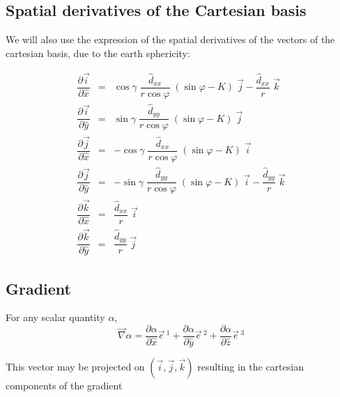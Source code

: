 \subsection{Spatial derivatives of the Cartesian basis}

We will also use the expression of the spatial derivatives of the
vectors of the cartesian basis, due to the earth sphericity:

\begin{eqnarray}
\dfrac{\partial \vec{i}}{\partial \widehat{x}} & = & \cos\gamma \;
\dfrac{\widehat{d}_{xx}}{r \cos\varphi}  \; (\sin\varphi - K)
\;\vec{j} -   \dfrac{\widehat{d}_{xx}}{r} \;  \vec{k} \nonumber \\
\dfrac{\partial \vec{i}}{\partial \widehat{y}} & = & \sin\gamma \;
\dfrac{\widehat{d}_{yy}}{r \cos\varphi}  \; (\sin\varphi - K)
\;\vec{j} \nonumber \\
\dfrac{\partial \vec{j}}{\partial \widehat{x}} & = & -\cos\gamma \;
\dfrac{\widehat{d}_{xx}}{r \cos\varphi}  \; (\sin\varphi - K)
\;\vec{i}  \\
\dfrac{\partial \vec{j}}{\partial \widehat{y}} & = & - \sin\gamma \;
\dfrac{\widehat{d}_{yy}}{r \cos\varphi}  \; (\sin\varphi - K)
\;\vec{i} -  \dfrac{\widehat{d}_{yy}}{r} \;  \vec{k} \nonumber \\
\dfrac{\partial \vec{k}}{\partial \widehat{x}} & = & \dfrac{\widehat{d}_{xx}}{r}
\;\vec{i} \nonumber \\
\dfrac{\partial \vec{k}}{\partial \widehat{y}} & = & \dfrac{\widehat{d}_{yy}}{r}
\;\vec{j} \nonumber
\end{eqnarray}


\subsection{Gradient}

For any scalar quantity $\alpha$,
\begin{equation}
\vec{\nabla} \alpha =
\dfrac{\partial \alpha }{\partial \widehat{x}}\vec{e} \, ^{1} +
\dfrac{\partial \alpha }{\partial \widehat{y}}\vec{e} \, ^{2} +
\dfrac{\partial \alpha }{\partial \widehat{z}}\vec{e} \, ^{3}
\end{equation}

This vector may be projected on $(\vec{i},\vec{j},\vec{k})$ resulting in
the cartesian components of the gradient

